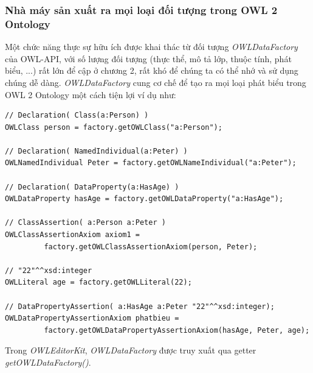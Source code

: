\subsubsection{Nhà máy sản xuất ra mọi loại đối tượng trong OWL 2 Ontology}
Một chức năng thực sự hữu ích được khai thác từ đối tượng \textit{OWLDataFactory} của OWL-API, với số lượng đối tượng (thực thể, mô tả lớp, thuộc tính, phát biểu, ...) rất lớn để cập ở chương 2, rất khó để chúng ta có thể nhớ và sử dụng chúng dễ dàng. \textit{OWLDataFactory} cung cơ chế để tạo ra mọi loại phát biểu trong OWL 2 Ontology một cách tiện lợi ví dụ như:
\begin{verbatim}
// Declaration( Class(a:Person) )
OWLClass person = factory.getOWLClass("a:Person");

// Declaration( NamedIndividual(a:Peter) )
OWLNamedIndividual Peter = factory.getOWLNameIndividual("a:Peter");

// Declaration( DataProperty(a:HasAge) )
OWLDataProperty hasAge = factory.getOWLDataProperty("a:HasAge");

// ClassAssertion( a:Person a:Peter )
OWLClassAssertionAxiom axiom1 = 
         factory.getOWLClassAssertionAxiom(person, Peter);
         
// "22"^^xsd:integer 
OWLLiteral age = factory.getOWLLiteral(22);

// DataPropertyAssertion( a:HasAge a:Peter "22"^^xsd:integer); 
OWLDataPropertyAssertionAxiom phatbieu = 
         factory.getOWLDataPropertyAssertionAxiom(hasAge, Peter, age);
\end{verbatim}
Trong \textit{OWLEditorKit}, \textit{OWLDataFactory} được truy xuất qua getter \textit{getOWLDataFactory()}.

